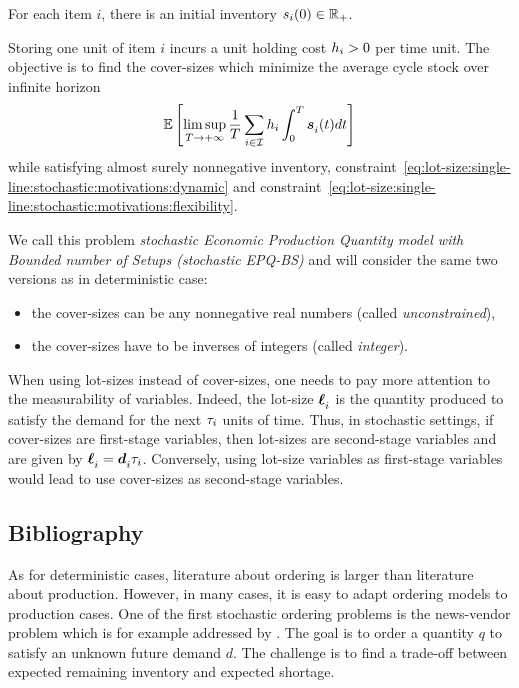 For each item $i$, there is an initial inventory $s_i\bracket{0}\in\RR_+$.


Storing one unit of item $i$ incurs a unit holding cost $h_i>0$ per time unit.
The objective is to find the cover-sizes which minimize the average cycle stock over infinite horizon
\begin{equation}
  \espe\sqbracket{
  \limsup_{\horizon\rightarrow+\infty}
  \frac{1}{\horizon} \sum_{i\in\REF} \holding_i \int_0^{\horizon}\va\inventory_i\bracket{t}dt
  }
\end{equation}
while satisfying almost surely nonnegative inventory, constraint~\eqref{eq:lot-size:single-line:stochastic:motivations:dynamic} and constraint~\eqref{eq:lot-size:single-line:stochastic:motivations:flexibility}.



We call this problem \emph{stochastic Economic Production Quantity model with Bounded number of Setups (stochastic EPQ-BS)} and will consider the same two versions as in deterministic case:
\begin{itemize}
  \item the cover-sizes can be any nonnegative real numbers (called \emph{unconstrained}),
  \item the cover-sizes have to be inverses of integers (called \emph{integer}).
\end{itemize}



When using lot-sizes instead of cover-sizes, one needs to pay more attention to the measurability of variables.
Indeed, the lot-size $\va\lot_i$ is the quantity produced to satisfy the demand for the next $\tau_i$ units of time.
Thus, in stochastic settings, if cover-sizes are first-stage variables, then lot-sizes are second-stage variables and are given by $\va\lot_i=\va\demand_i\cover_i$.
Conversely, using lot-size variables as first-stage variables would lead to use cover-sizes as second-stage variables.



\subsection{Bibliography}
\label{sec:lot-size:single-line:stochastic:bibliography}


As for deterministic cases, literature about ordering is larger than literature about production.
However, in many cases, it is easy to adapt ordering models to production cases.
One of the first stochastic ordering problems is the news-vendor problem which is for example addressed by \citet{Edgeworth88}.
The goal is to order a quantity $q$ to satisfy an unknown future demand $d$.
The challenge is to find a trade-off between expected remaining inventory and expected shortage.


